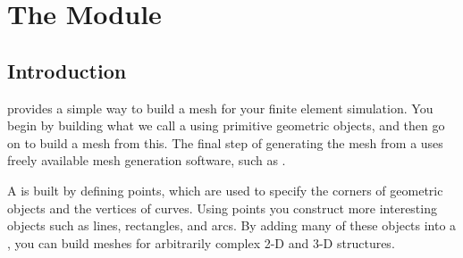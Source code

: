 
%
%
%

\chapter{The \pycad Module}\label{PYCAD CHAP}

\section{Introduction}

\pycad provides a simple way to build a mesh for your finite element
simulation. You begin by building what we call a  using
primitive geometric objects, and then go on to build a mesh from this.
The final step of generating the mesh from a  uses freely
available mesh generation software, such as \gmshextern.

A  is built by defining points, which are used to specify
the corners of geometric objects and the vertices of curves. Using
points you construct more interesting objects such as lines,
rectangles, and arcs. By adding many of these objects into a ,
you can build meshes for arbitrarily complex 2-D and 3-D structures.

